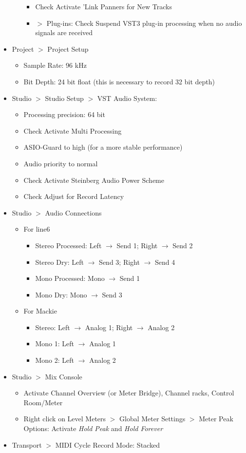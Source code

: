 \documentclass[10pt]{article}
\begin{document}
\begin{itemize}
\begin{itemize}
\begin{itemize}
			\item Check Activate 'Link Panners for New Tracks
			\item $>$ Plug-ins: Check Suspend VST3 plug-in processing when no audio signals are received
		\end{itemize}
	\end{itemize}
	\item Project $>$ Project Setup
	\begin{itemize}
		\item Sample Rate: 96 kHz
		\item Bit Depth: 24 bit float (this is necessary to record 32 bit depth)
	\end{itemize}
	\item Studio $>$ Studio Setup $>$ VST Audio System:
	\begin{itemize}
		\item Processing precision: 64 bit
		\item Check Activate Multi Processing
		\item ASIO-Guard to high (for a more stable performance)
		\item Audio priority to normal
		\item Check Activate Steinberg Audio Power Scheme
		\item Check Adjust for Record Latency
	\end{itemize}
	\item Studio $>$ Audio Connections
	\begin{itemize}
		\item For line6
		\begin{itemize}
			\item Stereo Processed: Left $\rightarrow$ Send 1; Right $\rightarrow$ Send 2
			\item Stereo Dry: Left $\rightarrow$ Send 3; Right $\rightarrow$ Send 4
			\item Mono Processed: Mono $\rightarrow$ Send 1
			\item Mono Dry: Mono $\rightarrow$ Send 3
		\end{itemize}
		\item For Mackie
		\begin{itemize}
			\item Stereo: Left $\rightarrow$ Analog 1; Right $\rightarrow$ Analog 2
			\item Mono 1: Left $\rightarrow$ Analog 1
			\item Mono 2: Left $\rightarrow$ Analog 2
		\end{itemize}
	\end{itemize}
	\item Studio $>$ Mix Console
	\begin{itemize}
		\item Activate Channel Overview (or Meter Bridge), Channel racks, Control Room/Meter
		\item Right click on Level Meters $>$ Global Meter Settings $>$ Meter Peak Options: Activate \textit{Hold Peak} and \textit{Hold Forever}
	\end{itemize}
	\item Transport $>$ MIDI Cycle Record Mode: Stacked
\end{itemize}
\end{document}
